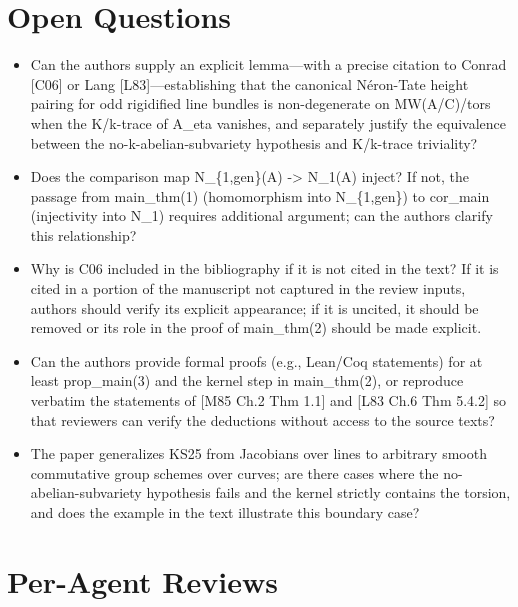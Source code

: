 \documentclass[11pt]{article}
\begin{document}
\section*{Open Questions}
\begin{itemize}[leftmargin=*]
  \item Can the authors supply an explicit lemma---with a precise citation to Conrad [C06] or Lang [L83]---establishing that the canonical Néron-Tate height pairing for odd rigidified line bundles is non-degenerate on MW(A/C)/tors when the K/k-trace of A\_eta vanishes, and separately justify the equivalence between the no-k-abelian-subvariety hypothesis and K/k-trace triviality?
  \item Does the comparison map N\_\{1,gen\}(A) -> N\_1(A) inject? If not, the passage from main\_thm(1) (homomorphism into N\_\{1,gen\}) to cor\_main (injectivity into N\_1) requires additional argument; can the authors clarify this relationship?
  \item Why is C06 included in the bibliography if it is not cited in the text? If it is cited in a portion of the manuscript not captured in the review inputs, authors should verify its explicit appearance; if it is uncited, it should be removed or its role in the proof of main\_thm(2) should be made explicit.
  \item Can the authors provide formal proofs (e.g., Lean/Coq statements) for at least prop\_main(3) and the kernel step in main\_thm(2), or reproduce verbatim the statements of [M85 Ch.2 Thm 1.1] and [L83 Ch.6 Thm 5.4.2] so that reviewers can verify the deductions without access to the source texts?
  \item The paper generalizes KS25 from Jacobians over lines to arbitrary smooth commutative group schemes over curves; are there cases where the no-abelian-subvariety hypothesis fails and the kernel strictly contains the torsion, and does the example in the text illustrate this boundary case?
\end{itemize}

\section*{Per-Agent Reviews}
\end{document}
